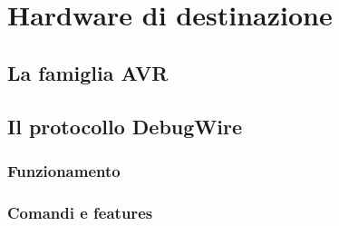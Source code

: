 \chapter{Hardware di destinazione}
    \section{La famiglia AVR}
    \section{Il protocollo DebugWire}
        \subsection{Funzionamento}
        \subsection{Comandi e features}